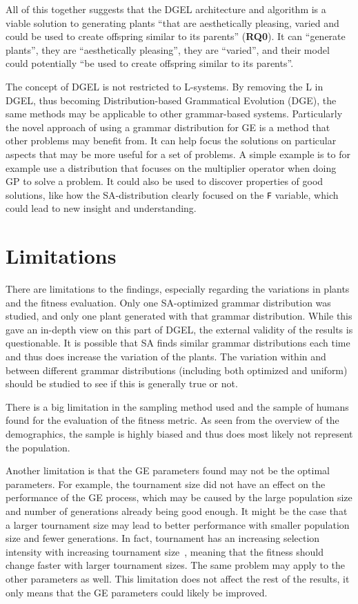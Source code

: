 All of this together suggests that the \gls{DGEL} architecture and algorithm is a viable solution to generating plants ``that are aesthetically pleasing, varied and could be used to create offspring similar to its parents'' (\textbf{RQ0}).
It can ``generate plants'', they are ``aesthetically pleasing'', they are ``varied'', and their model could potentially ``be used to create offspring similar to its parents''.

The concept of \gls{DGEL} is not restricted to \glspl{L-system}.
By removing the L in \gls{DGEL}, thus becoming Distribution-based Grammatical Evolution (DGE), the same methods may be applicable to other grammar-based systems.
Particularly the novel approach of using a grammar distribution for \gls{GE} is a method that other problems may benefit from.
It can help focus the solutions on particular aspects that may be more useful for a set of problems.
A simple example is to for example use a distribution that focuses on the multiplier operator when doing \gls{GP} to solve a problem.
It could also be used to discover properties of good solutions, like how the \gls{SA}-distribution clearly focused on the \texttt{F} variable, which could lead to new insight and understanding.

\section{Limitations}
There are limitations to the findings, especially regarding the variations in plants and the fitness evaluation.
Only one \gls{SA}-optimized grammar distribution was studied, and only one plant generated with that grammar distribution.
While this gave an in-depth view on this part of \gls{DGEL}, the external validity of the results is questionable.
It is possible that \gls{SA} finds similar grammar distributions each time and thus does increase the variation of the plants.
The variation within and between different grammar distributions (including both optimized and uniform) should be studied to see if this is generally true or not.

There is a big limitation in the sampling method used and the sample of humans found for the evaluation of the fitness metric.
As seen from the overview of the demographics, the sample is highly biased and thus does most likely not represent the population.

Another limitation is that the \gls{GE} parameters found may not be the optimal parameters.
For example, the tournament size did not have an effect on the performance of the \gls{GE} process, which may be caused by the large population size and number of generations already being good enough.
It might be the case that a larger tournament size may lead to better performance with smaller population size and fewer generations.
In fact, tournament has an increasing selection intensity with increasing tournament size~\cite{1995Blickle}, meaning that the fitness should change faster with larger tournament sizes.
The same problem may apply to the other parameters as well.
This limitation does not affect the rest of the results, it only means that the \gls{GE} parameters could likely be improved.

